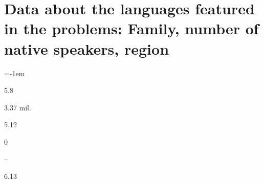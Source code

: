 \chapter[Data about the languages featured in the problems]{Data about the languages featured in the problems: Family, number of native speakers, region}
\label{appendix:1}

\begin{description}[font=\normalfont,style=nextline]\multicolsep=0pt\columnsep=-1em
\item[\langnameAcehnese] 
 \begin{multicols}{2}\begin{description}[font=\normalfont\itshape,noitemsep] 
 \item[]
 \item[\pbnumberabbr] 5.8 
 \item[\family] \famAustronesian 
 \item[]
\item[\nativespeakers] 3.37 mil. 
 \item[\region] \regionIndonesia 
 \end{description}\end{multicols}
\item[\langnameAfrihili] 
 \begin{multicols}{2}\begin{description}[font=\normalfont\itshape,noitemsep] 
 \item[] 
 \item[\pbnumberabbr] 5.12 
 \item[\family] \famConstructed 
 \item[]
\item[\nativespeakers] 0 
 \item[\region] --
 \end{description}\end{multicols}
\item[\langnameAinu] 
 \begin{multicols}{2}\begin{description}[font=\normalfont\itshape,noitemsep] 
 \item[] 
 \item[\pbnumberabbr] 6.13 

\end{description}
\end{multicols}
\end{description}
